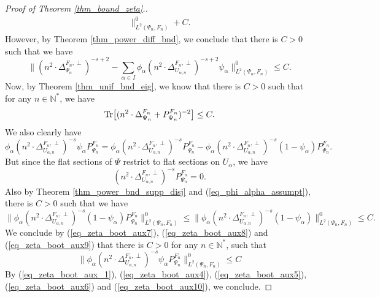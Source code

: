 \documentclass[12pt]{article}
\numberwithin{equation}{section}
\theoremstyle{theorem}
\theoremstyle{definition}
\theoremstyle{remark}
\newcommand{\nat}{\mathbb{N}}
\newcommand{\laplcomp}{\Delta}
\newcommand{\tr}[1]{{\rm{Tr}} \big[ #1 \big]}
\begin{document}
\begin{proof}[Proof of Theorem \ref{thm_bound_zeta}.]
\begin{multline}
			\Big\|_{L^2(\Psi_n, F_n)}^{0}
			+
			C.
		\end{multline}
		However, by Theorem \ref{thm_power_diff_bnd}, we conclude that there is $C > 0$ such that we have
		\begin{equation}\label{eq_zeta_boot_aux5}
			\Big\| 
			(n^2 \cdot\laplcomp_{\Psi_n}^{F_n, \perp})^{-s+2} 
			- 
			\sum_{\alpha \in I} \phi_{\alpha} (n^2 \cdot  \laplcomp_{U_{\alpha, n}}^{F_n, \perp})^{-s + 2} \psi_{\alpha}
			\Big\|_{L^2(\Psi_n, F_n)}^{0}
			\leq
			C.
		\end{equation}
		Now, by Theorem \ref{thm_unif_bnd_eig}, we know that there is $C > 0$ such that for any $n \in \nat^*$, we have
		\begin{equation}\label{eq_zeta_boot_aux6}
			\tr{(n^2 \cdot\laplcomp_{\Psi_n}^{F_n} + P_{\Psi_n}^{F_n})^{-2}} \leq C.
		\end{equation}
		We also clearly have 
		\begin{equation}\label{eq_zeta_boot_aux7}
			\phi_{\alpha} (n^2 \cdot  \laplcomp_{U_{\alpha, n}}^{F_n, \perp})^{-s} \psi_{\alpha} P_{\Psi_n}^{F_n} =
			\phi_{\alpha} (n^2 \cdot  \laplcomp_{U_{\alpha, n}}^{F_n, \perp})^{-s} P_{\Psi_n}^{F_n} 
			-
			\phi_{\alpha} (n^2 \cdot  \laplcomp_{U_{\alpha, n}}^{F_n, \perp})^{-s} (1 - \psi_{\alpha}) P_{\Psi_n}^{F_n}.
		\end{equation}
		But since the flat sections of $\Psi$ restrict to flat sections on $U_{\alpha}$, we have
		\begin{equation}\label{eq_zeta_boot_aux8}
				(n^2 \cdot  \laplcomp_{U_{\alpha, n}}^{F_n, \perp})^{-s} P_{\Psi_n}^{F_n} = 0.
		\end{equation}
		Also by Theorem \ref{thm_power_bnd_supp_disj} and (\ref{eq_phi_alpha_assumpt}), there is $C > 0$ such that we have
		\begin{equation}\label{eq_zeta_boot_aux9}
			\Big\| \phi_{\alpha} (n^2 \cdot  \laplcomp_{U_{\alpha, n}}^{F_n, \perp})^{-s} (1 - \psi_{\alpha}) P_{\Psi_n}^{F_n} \Big \|_{L^2(\Psi_n, F_n)}^{0}
			\leq
			\Big\| \phi_{\alpha} (n^2 \cdot  \laplcomp_{U_{\alpha, n}}^{F_n, \perp})^{-s} (1 - \psi_{\alpha}) \Big \|_{L^2(\Psi_n, F_n)}^{0}
			\leq
			C.
		\end{equation}
		We conclude by (\ref{eq_zeta_boot_aux7}),  (\ref{eq_zeta_boot_aux8}) and (\ref{eq_zeta_boot_aux9}) that there is $C > 0$ for any $n \in \nat^*$, such that
		\begin{equation}\label{eq_zeta_boot_aux10}
			\Big\| \phi_{\alpha} (n^2 \cdot  \laplcomp_{U_{\alpha, n}}^{F_n, \perp})^{-s} \psi_{\alpha} P_{\Psi_n}^{F_n} \Big \|_{L^2(\Psi_n, F_n)}^{0}
			\leq 
			C
		\end{equation}
		By (\ref{eq_zeta_boot_aux_1}), (\ref{eq_zeta_boot_aux4}), (\ref{eq_zeta_boot_aux5}), (\ref{eq_zeta_boot_aux6}) and (\ref{eq_zeta_boot_aux10}), we conclude.
	\end{proof}
	 
\end{document}
